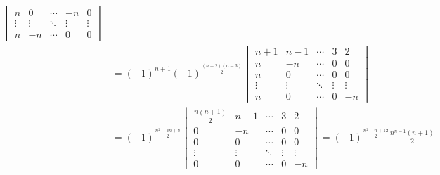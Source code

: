 \begin{enumerate}
\begin{enumerate}
\begin{enumerate}
\begin{align*}
\begin{vmatrix}
                                                     n      & 0      & \cdots & -n     & 0      \\
                                                     \vdots & \vdots & \ddots & \vdots & \vdots \\
                                                     n      & -n     & \cdots & 0      & 0
                                                 \end{vmatrix}                                   \\
                                    & =(-1)^{n+1}(-1)^{\frac{(n-2)(n-3)}{2}}
                                  \begin{vmatrix}
                                      n+1    & n-1    & \cdots & 3      & 2      \\
                                      n      & -n     & \cdots & 0      & 0      \\
                                      n      & 0      & \cdots & 0      & 0      \\
                                      \vdots & \vdots & \ddots & \vdots & \vdots \\
                                      n      & 0      & \cdots & 0      & -n
                                  \end{vmatrix}                                                  \\
                                    & =(-1)^{\frac{n^2-3n+8}{2}}\begin{vmatrix}
                                                                    \frac{n(n+1)}{2} & n-1    & \cdots & 3      & 2      \\
                                                                    0                & -n     & \cdots & 0      & 0      \\
                                                                    0                & 0      & \cdots & 0      & 0      \\
                                                                    \vdots           & \vdots & \ddots & \vdots & \vdots \\
                                                                    0                & 0      & \cdots & 0      & -n
                                                                \end{vmatrix}=(-1)^{\frac{n^2-n+12}{2}}\frac{n^{n-1}(n+1)}{2}
                              \end{align*}


\end{enumerate}
\end{enumerate}
\end{enumerate}

